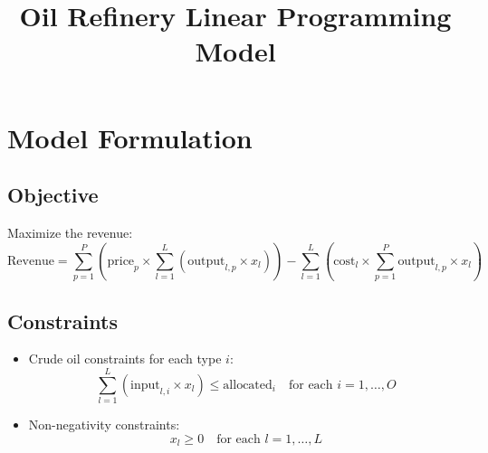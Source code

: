 \documentclass{article}
\begin{document}
\title{Oil Refinery Linear Programming Model}
\author{}
\date{}
\maketitle

\section*{Model Formulation}

\subsection*{Objective}

Maximize the revenue:
\[
\text{Revenue} = \sum_{p=1}^{P} \left( \text{price}_p \times \sum_{l=1}^{L} (\text{output}_{l,p} \times x_l) \right) - \sum_{l=1}^{L} (\text{cost}_l \times \sum_{p=1}^{P} \text{output}_{l,p} \times x_l)
\]

\subsection*{Constraints}

\begin{itemize}
    \item Crude oil constraints for each type \( i \):
    \[
    \sum_{l=1}^{L} (\text{input}_{l,i} \times x_l) \leq \text{allocated}_i \quad \text{for each } i = 1, \dots, O
    \]
    \item Non-negativity constraints:
    \[
    x_l \geq 0 \quad \text{for each } l = 1, \dots, L
    \]
\end{itemize}
\end{document}
